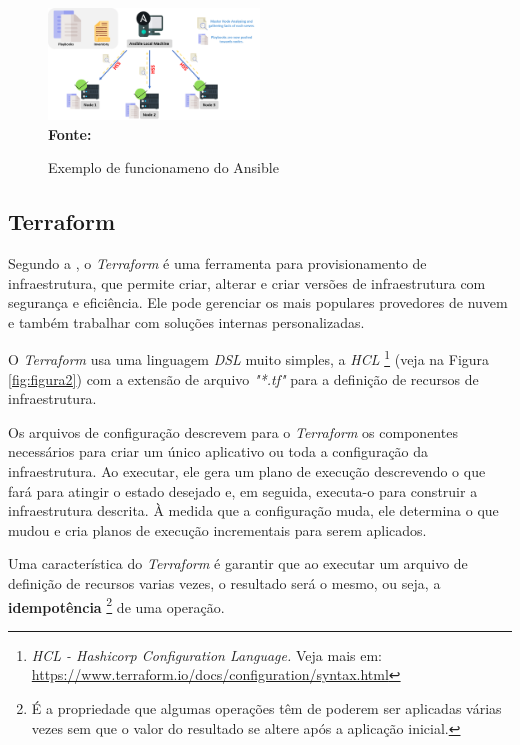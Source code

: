  \begin{figure}[ht]
	\centering	
	\caption[\hspace{0.1cm}Exemplo de funcionameno do Ansible]{Exemplo de funcionameno do Ansible}
	\vspace{-0.4cm}
	\includegraphics[width=0.5\textwidth]{figuras/ansible-working.png}
	 \vspace{-0.2cm}
	\\\textbf{\footnotesize Fonte: \cite{intellipaat}}
	\label{fig:figura6}
\end{figure}
\vspace{-0.5cm}

\subsection{Terraform} \label{terraform} 

 Segundo a , o \textit{Terraform} é uma ferramenta para provisionamento de infraestrutura, que permite criar, alterar e criar versões de infraestrutura com segurança e eficiência. Ele pode gerenciar os mais populares provedores de nuvem e também trabalhar com soluções internas personalizadas.

O \textit{Terraform} usa uma linguagem \textit{DSL} muito simples, a \textit{HCL} \footnote{\textit{HCL - Hashicorp Configuration Language.} Veja mais em: \href{https://www.terraform.io/docs/configuration/syntax.html}{https://www.terraform.io/docs/configuration/syntax.html} } (veja na Figura \ref{fig:figura2}) com a extensão de arquivo \textit{"*.tf"} para a definição de recursos de infraestrutura. 

Os arquivos de configuração descrevem para o \textit{Terraform} os componentes necessários para criar um único aplicativo ou toda a configuração da infraestrutura. Ao executar, ele gera um plano de execução descrevendo o que fará para atingir o estado desejado e, em seguida, executa-o para construir a infraestrutura descrita. 
À medida que a configuração muda, ele determina o que mudou e cria planos de execução incrementais para serem aplicados.

Uma característica do \textit{Terraform} é garantir que ao executar um arquivo de definição de recursos varias vezes, o resultado será o mesmo, ou seja, a \textbf{idempotência} \footnote{É a propriedade que algumas operações têm de poderem ser aplicadas várias vezes sem que o valor do resultado se altere após a aplicação inicial.} de uma operação.

